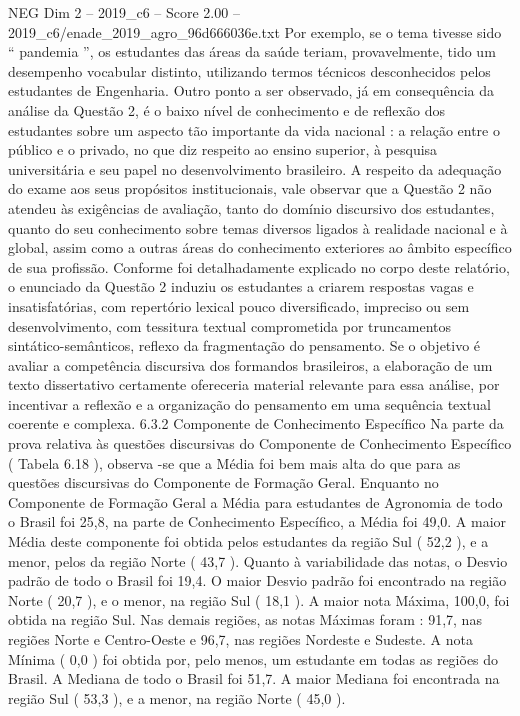 \begin{textsample}{NEG Dim 2 – 2019\_c6 – Score 2.00 – 2019\_c6/enade\_2019\_agro\_96d666036e.txt}
Por exemplo, se o tema tivesse sido “ pandemia ”, os estudantes das áreas da saúde teriam, provavelmente, tido um desempenho vocabular distinto, utilizando termos técnicos desconhecidos pelos estudantes de Engenharia.
Outro ponto a ser observado, já em consequência da análise da Questão 2, é o baixo nível de conhecimento e de reflexão dos estudantes sobre um aspecto tão importante da vida nacional : a relação entre o público e o privado, no que diz respeito ao ensino superior, à pesquisa universitária e seu papel no desenvolvimento brasileiro.
A respeito da adequação do exame aos seus propósitos institucionais, vale observar que a Questão 2 não atendeu às exigências de avaliação, tanto do domínio discursivo dos estudantes, quanto do seu conhecimento sobre temas diversos ligados à realidade nacional e à global, assim como a outras áreas do conhecimento exteriores ao âmbito específico de sua profissão.
Conforme foi detalhadamente explicado no corpo deste relatório, o enunciado da Questão 2 induziu os estudantes a criarem respostas vagas e insatisfatórias, com repertório lexical pouco diversificado, impreciso ou sem desenvolvimento, com tessitura textual comprometida por truncamentos sintático-semânticos, reflexo da fragmentação do pensamento.
Se o objetivo é avaliar a competência discursiva dos formandos brasileiros, a elaboração de um texto dissertativo certamente ofereceria material relevante para essa análise, por incentivar a reflexão e a organização do pensamento em uma sequência textual coerente e complexa. 6.3.2 Componente de Conhecimento Específico Na parte da prova relativa às questões discursivas do Componente de Conhecimento Específico ( Tabela 6.18 ), observa -se que a Média foi bem mais alta do que para as questões discursivas do Componente de Formação Geral.
Enquanto no Componente de Formação Geral a Média para estudantes de Agronomia de todo o Brasil foi 25,8, na parte de Conhecimento Específico, a Média foi 49,0.
A maior Média deste componente foi obtida pelos estudantes da região Sul ( 52,2 ), e a menor, pelos da região Norte ( 43,7 ).
Quanto à variabilidade das notas, o Desvio padrão de todo o Brasil foi 19,4.
O maior Desvio padrão foi encontrado na região Norte ( 20,7 ), e o menor, na região Sul ( 18,1 ).
A maior nota Máxima, 100,0, foi obtida na região Sul.
Nas demais regiões, as notas Máximas foram : 91,7, nas regiões Norte e Centro-Oeste e 96,7, nas regiões Nordeste e Sudeste.
A nota Mínima ( 0,0 ) foi obtida por, pelo menos, um estudante em todas as regiões do Brasil.
A Mediana de todo o Brasil foi 51,7.
A maior Mediana foi encontrada na região Sul ( 53,3 ), e a menor, na região Norte ( 45,0 ).

\end{textsample}
